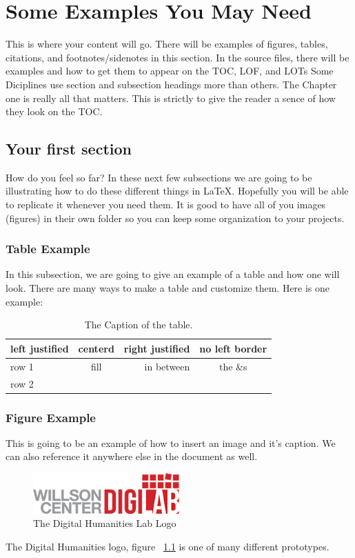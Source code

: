 \documentclass[./dissertation.tex]{subfiles}
\begin{document}
    \chapter{Some Examples You May Need}
    This is where your content will go. There will be examples of figures, tables, citations, and footnotes/sidenotes in this section. In the source files, there will be examples and how to get them to appear on the TOC, LOF, and LOTs Some Diciplines use section and subsection headings more than others. The Chapter one is really all that matters. This is strictly to give the reader a sence of how they look on the TOC.
    \section{Your first section}
      How do you feel so far? In these next few subsections we are going to be illustrating how to do these different things in LaTeX. Hopefully you will be able to replicate it whenever you need them.
      It is good to have all of you images (figures) in their own folder so you can keep some organization to your projects.

      \subsection{Table Example}
        In this subsection, we are going to give an example of a table and how one will look. There are many ways to make a table and customize them. Here is one example:


      \begin{table}[ht]
        \centering

      \begin{tabular}[c]{|l|c|rc|}
        \hline
        left justified  & centerd  & right justified  & no left border\\
        \hline
        row 1 & fill & in between & the \&s\\
        row 2 & & &\\
        \hline
      \end{tabular}
      \caption{The Caption of the table.}
      \label{table:someTable}
      \end{table}



      \subsection{Figure Example}
      This is going to be an example of how to insert an image and it's caption. We can also reference it anywhere else in the document as well.
      \begin{figure}[h]
        \centering\includegraphics[width=0.5\textwidth]{figures/digilab_logo}
        \caption{The Digital Humanities Lab Logo}
        \label{fig:digilogo}
      \end{figure}
      The Digital Humanities logo, figure ~\ref{fig:digilogo} is one of many different prototypes.
\end{document}
